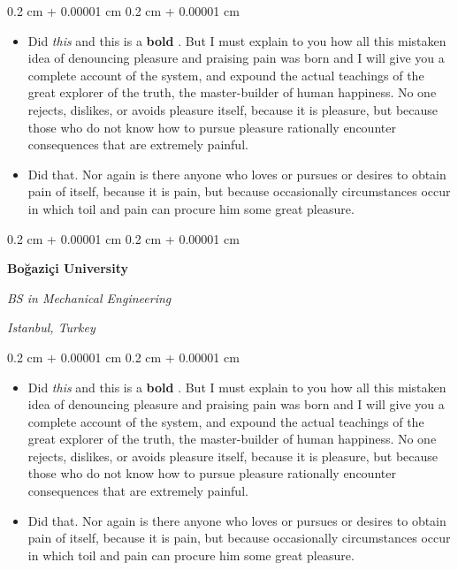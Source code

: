 \documentclass[10pt, letterpaper]{article}
\newenvironment{highlights}{
    \begin{itemize}[
        topsep=0.10 cm,
        parsep=0.10 cm,
        partopsep=0pt,
        itemsep=0pt,
        leftmargin=0.4 cm + 10pt
    ]
}{
    \end{itemize}
} %
\newenvironment{onecolentry}{
    \begin{adjustwidth}{
        0.2 cm + 0.00001 cm
    }{
        0.2 cm + 0.00001 cm
    }
}{
    \end{adjustwidth}
} %
\newenvironment{twocolentry}[2][]{
    \onecolentry
    \def\secondColumn{#2}
    \setcolumnwidth{\fill, 4.5 cm}
    \begin{paracol}{2}
}{
    \switchcolumn \raggedleft \secondColumn
    \end{paracol}
    \endonecolentry
} %
\let\hrefWithoutArrow\href
\renewcommand{\href}[2]{\hrefWithoutArrow{#1}{\ifthenelse{\equal{#2}{}}{ }{#2 }\raisebox{.15ex}{\footnotesize \faExternalLink*}}}
\begin{document}
        \vspace{0.10 cm}
        \begin{onecolentry}
            \begin{highlights}
                \item Did \textit{this} and this is a \textbf{bold} \href{https://example.com}{link}. But I must explain to you how all this mistaken idea of denouncing pleasure and praising pain was born and I will give you a complete account of the system, and expound the actual teachings of the great explorer of the truth, the master-builder of human happiness. No one rejects, dislikes, or avoids pleasure itself, because it is pleasure, but because those who do not know how to pursue pleasure rationally encounter consequences that are extremely painful.
                \item Did that. Nor again is there anyone who loves or pursues or desires to obtain pain of itself, because it is pain, but because occasionally circumstances occur in which toil and pain can procure him some great pleasure.
            \end{highlights}
        \end{onecolentry}


        \vspace{0.2 cm}

        \begin{twocolentry}{
        \textit{Istanbul, Turkey}    
            
        }
            \textbf{Boğaziçi University}

            \textit{BS in Mechanical Engineering}
        \end{twocolentry}

        \vspace{0.10 cm}
        \begin{onecolentry}
            \begin{highlights}
                \item Did \textit{this} and this is a \textbf{bold} \href{https://example.com}{link}. But I must explain to you how all this mistaken idea of denouncing pleasure and praising pain was born and I will give you a complete account of the system, and expound the actual teachings of the great explorer of the truth, the master-builder of human happiness. No one rejects, dislikes, or avoids pleasure itself, because it is pleasure, but because those who do not know how to pursue pleasure rationally encounter consequences that are extremely painful.
                \item Did that. Nor again is there anyone who loves or pursues or desires to obtain pain of itself, because it is pain, but because occasionally circumstances occur in which toil and pain can procure him some great pleasure.
            \end{highlights}
        \end{onecolentry}
\end{document}
